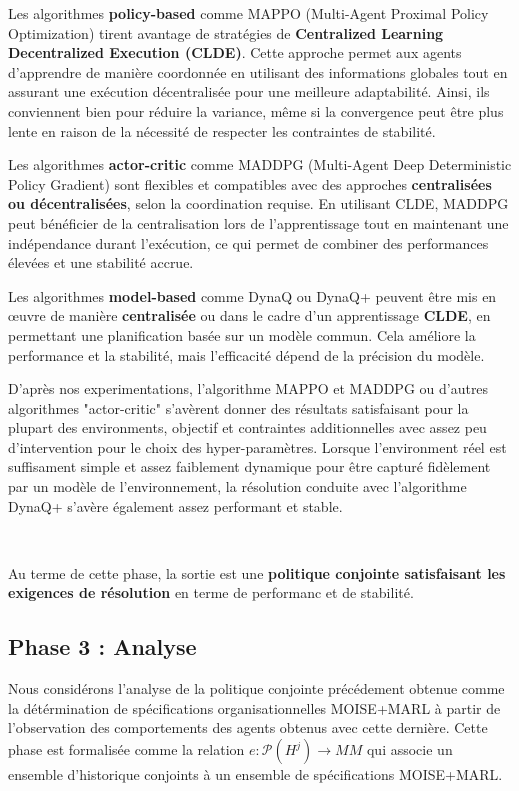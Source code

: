 \documentclass[sigconf,anonymous]{aamas}
\begin{document}
Les algorithmes \textbf{policy-based} comme MAPPO (Multi-Agent Proximal Policy Optimization) tirent avantage de stratégies de \textbf{Centralized Learning Decentralized Execution (CLDE)}. Cette approche permet aux agents d'apprendre de manière coordonnée en utilisant des informations globales tout en assurant une exécution décentralisée pour une meilleure adaptabilité. Ainsi, ils conviennent bien pour réduire la variance, même si la convergence peut être plus lente en raison de la nécessité de respecter les contraintes de stabilité.

Les algorithmes \textbf{actor-critic} comme MADDPG (Multi-Agent Deep Deterministic Policy Gradient) sont flexibles et compatibles avec des approches \textbf{centralisées ou décentralisées}, selon la coordination requise. En utilisant CLDE, MADDPG peut bénéficier de la centralisation lors de l'apprentissage tout en maintenant une indépendance durant l'exécution, ce qui permet de combiner des performances élevées et une stabilité accrue.

Les algorithmes \textbf{model-based} comme DynaQ ou DynaQ+ peuvent être mis en œuvre de manière \textbf{centralisée} ou dans le cadre d'un apprentissage \textbf{CLDE}, en permettant une planification basée sur un modèle commun. Cela améliore la performance et la stabilité, mais l'efficacité dépend de la précision du modèle.

D'après nos experimentations, l'algorithme MAPPO et MADDPG ou d'autres algorithmes "actor-critic" s'avèrent donner des résultats satisfaisant pour la plupart des environments, objectif et contraintes additionnelles avec assez peu d'intervention pour le choix des hyper-paramètres. Lorsque l'environment réel est suffisament simple et assez faiblement dynamique pour être capturé fidèlement par un modèle de l'environnement, la résolution conduite avec l'algorithme DynaQ+ s'avère également assez performant et stable.

\

Au terme de cette phase, la sortie est une \textbf{politique conjointe satisfaisant les exigences de résolution} en terme de performanc et de stabilité.

\subsection{Phase 3 : Analyse}

Nous considérons l'analyse de la politique conjointe précédement obtenue comme la détérmination de spécifications organisationnelles MOISE+MARL à partir de l'observation des comportements des agents obtenus avec cette dernière. Cette phase est formalisée comme la relation $e: \mathcal{P}(H^{j}) \to MM$ qui associe un ensemble d'historique conjoints à un ensemble de spécifications MOISE+MARL.
\end{document}
